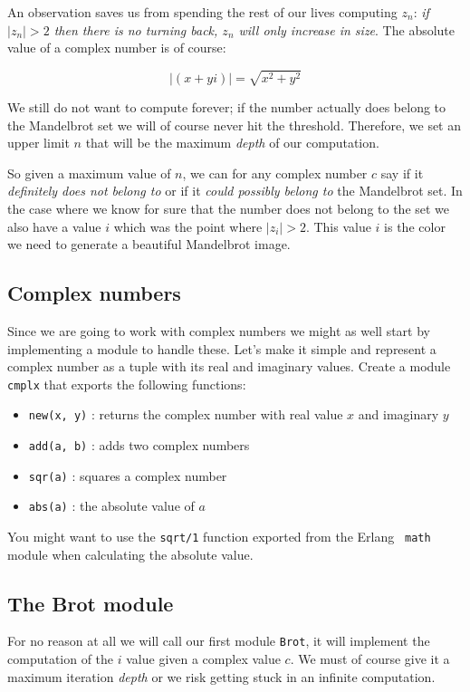 \documentclass[a4paper,11pt]{article}
\begin{document}
An observation saves us from spending the rest of our lives computing
$z_n$: {\em if $|z_n| > 2$ then there is no turning back, $z_n$ will
  only increase in size}. The absolute value of a complex number is of
course:

$$|(x + yi)| = \sqrt{x^2 + y^2}  $$

We still do not want to compute forever; if the number actually does
belong to the Mandelbrot set we will of course never hit the
threshold. Therefore, we set an upper limit $n$ that will be the
maximum {\em depth} of our computation.

So given a maximum value of $n$, we can for any complex number $c$ say
if it {\em definitely does not belong to} or if it {\em could possibly
  belong to} the Mandelbrot set. In the case where we know for sure
that the number does not belong to the set we also have a value $i$
which was the point where $|z_i| > 2$. This value $i$ is the color we
need to generate a beautiful Mandelbrot image.


\subsection{Complex numbers}
Since we are going to work with complex numbers we might as well start
by implementing a module to handle these. Let's make it simple and
represent a complex number as a tuple with its real and imaginary
values. Create a module {\tt cmplx} that exports the following
functions:

\begin{itemize}
 \item {\tt new(x, y)} : returns the complex number with real value $x$ and imaginary $y$
 \item {\tt add(a, b)} : adds two complex numbers
 \item {\tt sqr(a)} : squares a complex number
 \item {\tt abs(a)} : the absolute value of $a$
\end{itemize}

You might want to use the {\tt sqrt/1} function exported from the Erlang {\tt
  math} module when calculating the absolute value.
  

\subsection{The Brot module}

For no reason at all we will call our first module {\tt Brot}, it will
implement the computation of the $i$ value given a complex value
$c$. We must of course give it a maximum iteration {\em depth} or we
risk getting stuck in an infinite computation.
\end{document}
